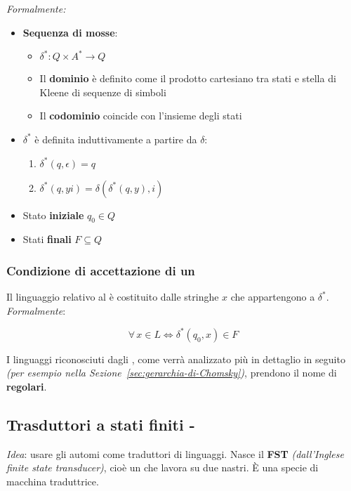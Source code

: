 \documentclass[italian, 10pt]{article}
\begin{document}
\bigskip
\textit{Formalmente:}
\begin{itemize}
  \item \textbf{Sequenza di mosse}:
        \begin{itemize}
          \item \(\delta^\ast : Q \times A^\ast \rightarrow Q\)
          \item Il \textbf{dominio} è definito come il prodotto cartesiano tra stati e stella di Kleene di sequenze di simboli
          \item Il \textbf{codominio} coincide con l'insieme degli stati
        \end{itemize}
  \item \(\delta^\ast\) è definita induttivamente a partire da \(\delta\):
        \begin{enumerate}
          \item \(\delta^\ast(q, \epsilon) = q\)
          \item \(\delta^\ast(q, yi) = \delta\left(\delta^\ast(q, y), i\right)\)
        \end{enumerate}
  \item Stato \textbf{iniziale} \(q_0 \in Q\)
  \item Stati \textbf{finali} \( F \subseteq Q \)
\end{itemize}

\subsubsection{Condizione di accettazione di un \FSA}

Il linguaggio relativo al \FSA è costituito dalle stringhe \(x\) che appartengono a \(\delta^\ast\).
\textit{Formalmente}:

\[ \forall \, x \in L \Leftrightarrow \delta^\ast (q_0, x) \in F \]

I linguaggi riconosciuti dagli \FSA, come verrà analizzato più in dettaglio in seguito \textit{(per esempio nella Sezione~\ref{sec:gerarchia-di-Chomsky})}, prendono il nome di \textbf{regolari}.

\subsection{Trasduttori a stati finiti - \FST}
\label{sec:trasduttori-a-stat-finiti}

\textit{Idea}: usare gli automi come traduttori di linguaggi.
Nasce il \textbf{FST} \textit{(dall'Inglese finite state transducer)}, cioè un \FSA che lavora su due nastri.
È una specie di macchina traduttrice.
\end{document}
